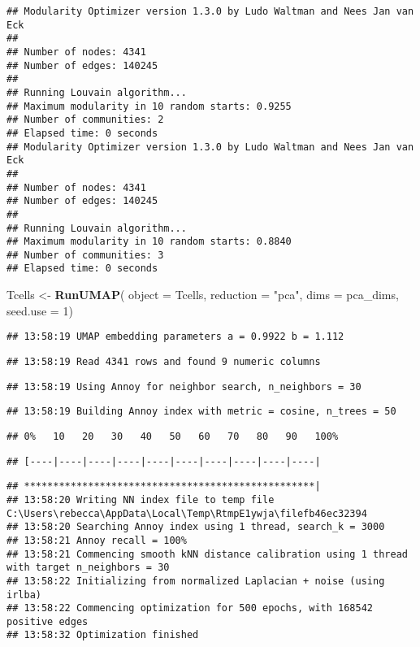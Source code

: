\documentclass[
]{article}
\newenvironment{Shaded}{\begin{snugshade}}{\end{snugshade}}
\newcommand{\AttributeTok}[1]{\textcolor[rgb]{0.13,0.29,0.53}{#1}}
\newcommand{\DecValTok}[1]{\textcolor[rgb]{0.00,0.00,0.81}{#1}}
\newcommand{\FunctionTok}[1]{\textcolor[rgb]{0.13,0.29,0.53}{\textbf{#1}}}
\newcommand{\NormalTok}[1]{#1}
\newcommand{\OtherTok}[1]{\textcolor[rgb]{0.56,0.35,0.01}{#1}}
\newcommand{\StringTok}[1]{\textcolor[rgb]{0.31,0.60,0.02}{#1}}
\begin{document}
\begin{verbatim}
## Modularity Optimizer version 1.3.0 by Ludo Waltman and Nees Jan van Eck
## 
## Number of nodes: 4341
## Number of edges: 140245
## 
## Running Louvain algorithm...
## Maximum modularity in 10 random starts: 0.9255
## Number of communities: 2
## Elapsed time: 0 seconds
## Modularity Optimizer version 1.3.0 by Ludo Waltman and Nees Jan van Eck
## 
## Number of nodes: 4341
## Number of edges: 140245
## 
## Running Louvain algorithm...
## Maximum modularity in 10 random starts: 0.8840
## Number of communities: 3
## Elapsed time: 0 seconds
\end{verbatim}

\begin{Shaded}
\begin{Highlighting}[]
\NormalTok{Tcells }\OtherTok{\textless{}{-}} \FunctionTok{RunUMAP}\NormalTok{(}
  \AttributeTok{object =}\NormalTok{ Tcells,}
  \AttributeTok{reduction =} \StringTok{"pca"}\NormalTok{,}
  \AttributeTok{dims =}\NormalTok{ pca\_dims,}
  \AttributeTok{seed.use =} \DecValTok{1}\NormalTok{)}
\end{Highlighting}
\end{Shaded}

\begin{verbatim}
## 13:58:19 UMAP embedding parameters a = 0.9922 b = 1.112
\end{verbatim}

\begin{verbatim}
## 13:58:19 Read 4341 rows and found 9 numeric columns
\end{verbatim}

\begin{verbatim}
## 13:58:19 Using Annoy for neighbor search, n_neighbors = 30
\end{verbatim}

\begin{verbatim}
## 13:58:19 Building Annoy index with metric = cosine, n_trees = 50
\end{verbatim}

\begin{verbatim}
## 0%   10   20   30   40   50   60   70   80   90   100%
\end{verbatim}

\begin{verbatim}
## [----|----|----|----|----|----|----|----|----|----|
\end{verbatim}

\begin{verbatim}
## **************************************************|
## 13:58:20 Writing NN index file to temp file C:\Users\rebecca\AppData\Local\Temp\RtmpE1ywja\filefb46ec32394
## 13:58:20 Searching Annoy index using 1 thread, search_k = 3000
## 13:58:21 Annoy recall = 100%
## 13:58:21 Commencing smooth kNN distance calibration using 1 thread with target n_neighbors = 30
## 13:58:22 Initializing from normalized Laplacian + noise (using irlba)
## 13:58:22 Commencing optimization for 500 epochs, with 168542 positive edges
## 13:58:32 Optimization finished
\end{verbatim}
\end{document}
